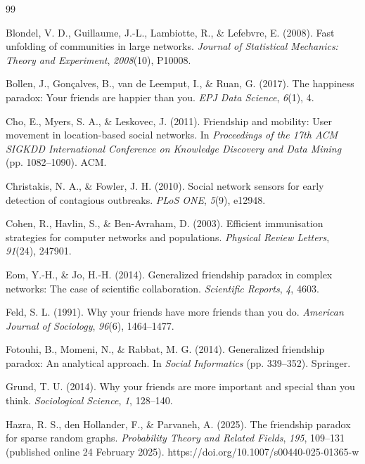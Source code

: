 \documentclass{nws}
\begin{document}
\begin{thebibliography}{99}

 Blondel, V. D., Guillaume, J.-L., Lambiotte, R., \& Lefebvre, E. (2008). Fast unfolding of communities in large networks. \emph{Journal of Statistical Mechanics: Theory and Experiment}, \emph{2008}(10), P10008.

 Bollen, J., Gon\c{c}alves, B., van
de Leemput, I., \& Ruan, G. (2017). The happiness paradox: Your friends are
happier than you. \emph{EPJ Data Science}, \emph{6}(1), 4.

 Cho, E., Myers, S. A., \& Leskovec, J. (2011). Friendship and mobility: User movement in location-based social networks. In \emph{Proceedings of the 17th ACM SIGKDD International Conference on Knowledge Discovery and Data Mining} (pp. 1082--1090). ACM.

 Christakis, N. A., \&
Fowler, J. H. (2010). Social network sensors for early detection of
contagious outbreaks. \emph{PLoS ONE}, \emph{5}(9), e12948.

 Cohen, R., Havlin,
S., \& Ben-Avraham, D. (2003). Efficient immunisation strategies for
computer networks and populations. \emph{Physical Review Letters},
\emph{91}(24), 247901.

 Eom, Y.-H., \& Jo, H.-H. (2014).
Generalized friendship paradox in complex networks: The case of scientific
collaboration. \emph{Scientific Reports}, \emph{4}, 4603.

 Feld, S. L. (1991). Why your friends have
more friends than you do. \emph{American Journal of Sociology},
\emph{96}(6), 1464--1477.

 Fotouhi, B.,
Momeni, N., \& Rabbat, M. G. (2014). Generalized friendship paradox: An
analytical approach. In \emph{Social Informatics} (pp. 339--352). Springer.

 Grund, T. U. (2014). Why your friends are
more important and special than you think. \emph{Sociological Science},
\emph{1}, 128--140.

 Hazra, R. S.,
den Hollander, F., \& Parvaneh, A. (2025). The friendship paradox for sparse
random graphs. \emph{Probability Theory and Related Fields}, \emph{195},
109--131 (published online 24 February 2025). https://doi.org/10.1007/s00440-025-01365-w


\end{thebibliography}
\end{document}
